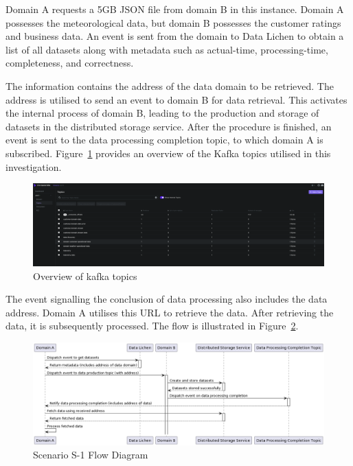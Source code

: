 \documentclass[journal]{IEEEtran}
\begin{document}
Domain A requests a 5GB JSON file from domain B in this instance. Domain A possesses the meteorological data, but domain B possesses the customer ratings and business data. An event is sent from the domain to Data Lichen to obtain a list of all datasets along with metadata such as actual-time, processing-time, completeness, and correctness. 

The information contains the address of the data domain to be retrieved. The address is utilised to send an event to domain B for data retrieval. This activates the internal process of domain B, leading to the production and storage of datasets in the distributed storage service. After the procedure is finished, an event is sent to the data processing completion topic, to which domain A is subscribed. Figure~\ref{kafkaTopics} provides an overview of the Kafka topics utilised in this investigation.

\begin{figure}[h]
  \centering
  \includegraphics[width=\textwidth]{images/kafka-topics.png}
  \caption{Overview of kafka topics}
  \label{kafkaTopics}
\end{figure}

The event signalling the conclusion of data processing also includes the data address. Domain A utilises this URL to retrieve the data. After retrieving the data, it is subsequently processed. The flow is illustrated in Figure~\ref{s1Flow}.

\begin{figure}[h]
  \centering
  \includegraphics[width=\textwidth]{images/Scenario-s1.png}
  \caption{Scenario S-1 Flow Diagram}
  \label{s1Flow}
\end{figure}
\end{document}
